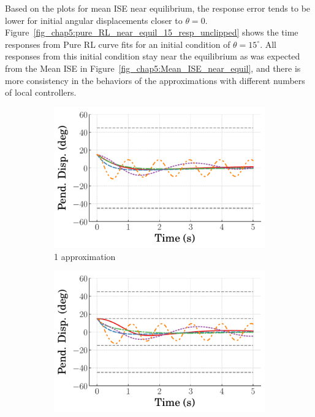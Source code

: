 Based on the plots for mean ISE near equilibrium, the response error tends to be lower for initial angular displacements closer to $\theta=0$.
Figure~\ref{fig_chap5:pure_RL_near_equil_15_resp_unclipped} shows the time responses from Pure RL curve fits for an initial condition of $\theta=15^\circ$. All responses from this initial condition stay near the equilibrium as was expected from the Mean ISE in Figure~\ref{fig_chap5:Mean_ISE_near_equil}, and there is more consistency in the behaviors of the approximations with different numbers of local controllers.
%
\begin{figure}[tb]
    \centering
    \begin{subfigure}[b]{0.32\textwidth}
        \centering
        \includegraphics[width=\textwidth]{figures/figures_Interpretability/Mean_ISE_Inverted_Pendulum-v0_cubic_1_bins_near_equil/Curve_fit_time_responses/pure_RL/curve_fit_Pend_Disp_15.pdf}
        \caption{1 approximation}
        \label{subfig_chap5:pure_RL_near_equil_15_1_bins_resp_unclipped}
    \end{subfigure}
    \hfill
    \begin{subfigure}[b]{0.32\textwidth}
        \centering
        \includegraphics[width=\textwidth]{figures/figures_Interpretability/Mean_ISE_Inverted_Pendulum-v0_cubic_3_bins_near_equil/Curve_fit_time_responses/pure_RL/curve_fit_Pend_Disp_15.pdf}

\end{subfigure}
\end{figure}
